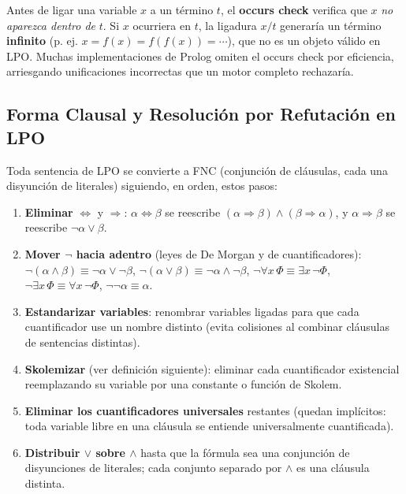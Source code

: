 \begin{definition}
Antes de ligar una variable $x$ a un término $t$, el \textbf{occurs check} verifica que $x$ \emph{no
aparezca dentro de} $t$. Si $x$ ocurriera en $t$, la ligadura $x/t$ generaría un término
\textbf{infinito} (p. ej. $x = f(x) = f(f(x)) = \cdots$), que no es un objeto válido en LPO. Muchas
implementaciones de Prolog omiten el occurs check por eficiencia, arriesgando unificaciones
incorrectas que un motor completo rechazaría.
\end{definition}

\subsection{Forma Clausal y Resolución por Refutación en LPO}

\begin{definition}
Toda sentencia de LPO se convierte a FNC (conjunción de cláusulas, cada una disyunción de literales)
siguiendo, en orden, estos pasos:
\begin{enumerate}
    \item \textbf{Eliminar} $\Leftrightarrow$ y $\Rightarrow$: $\alpha\Leftrightarrow\beta$ se
    reescribe $(\alpha\Rightarrow\beta)\land(\beta\Rightarrow\alpha)$, y $\alpha\Rightarrow\beta$ se
    reescribe $\neg\alpha\lor\beta$.
    \item \textbf{Mover $\neg$ hacia adentro} (leyes de De Morgan y de cuantificadores):
    $\neg(\alpha\land\beta)\equiv\neg\alpha\lor\neg\beta$,
    $\neg(\alpha\lor\beta)\equiv\neg\alpha\land\neg\beta$,
    $\neg\forall x\,\Phi\equiv\exists x\,\neg\Phi$, $\neg\exists x\,\Phi\equiv\forall x\,\neg\Phi$,
    $\neg\neg\alpha\equiv\alpha$.
    \item \textbf{Estandarizar variables}: renombrar variables ligadas para que cada cuantificador use
    un nombre distinto (evita colisiones al combinar cláusulas de sentencias distintas).
    \item \textbf{Skolemizar} (ver definición siguiente): eliminar cada cuantificador existencial
    reemplazando su variable por una constante o función de Skolem.
    \item \textbf{Eliminar los cuantificadores universales} restantes (quedan implícitos: toda
    variable libre en una cláusula se entiende universalmente cuantificada).
    \item \textbf{Distribuir $\lor$ sobre $\land$} hasta que la fórmula sea una conjunción de
    disyunciones de literales; cada conjunto separado por $\land$ es una cláusula distinta.
\end{enumerate}
\end{definition}

